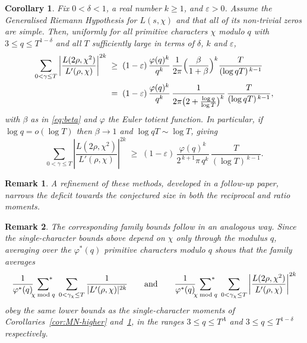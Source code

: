 \documentclass[10pt,a4paper]{amsart}
\newtheorem{corollary}[theorem]{Corollary}
\newtheorem*{remark}{Remark}
\numberwithin{equation}{section}
\begin{document}
\begin{corollary}\label{cor:Ng-higher}
Fix $0<\delta<1$, a real number $k\ge1$, and $\varepsilon>0$. Assume the
Generalised Riemann Hypothesis for $L(s,\chi)$ and that all of its non-trivial
zeros are simple. Then, uniformly for all primitive characters $\chi$ modulo $q$
with $3\le q\le T^{1-\delta}$ and all $T$ sufficiently large in terms of $\delta$,
$k$ and $\varepsilon$,
\begin{align*}
      \sum_{0<\gamma\le T}\left|\frac{L(2\rho,\chi^2)}{L'(\rho,\chi)}\right|^{2k}
  \;&\ge\;(1-\varepsilon)\,\frac{\varphi(q)^{k}}{q^{k}}\,\frac{1}{2\pi}
  \Bigl(\frac{\beta}{1+\beta}\Bigr)^{k}\frac{T}{(\log qT)^{\,k-1}} \\
  &=\;(1-\varepsilon)\,\frac{\varphi(q)^{k}}{q^{k}}\,
  \frac{1}{2\pi\bigl(2+\frac{\log q}{\log T}\bigr)^{k}}\,\frac{T}{(\log qT)^{\,k-1}},
\end{align*}
with $\beta$ as in \eqref{eq:beta} and $\varphi$ the Euler totient function. In
particular, if $\log q=o(\log T)$ then $\beta\to1$ and $\log qT\sim\log T$, giving
\[
  \sum_{0<\gamma\le T}\left|\frac{L(2\rho,\chi^2)}{L'(\rho,\chi)}\right|^{2k}
  \;\ge\;(1-\varepsilon)\,\frac{\varphi(q)^{k}}{2^{\,k+1}\pi\,q^{k}}\,
  \frac{T}{(\log T)^{\,k-1}} .
\]
\end{corollary}

\begin{remark}
A refinement of these methods, developed in a follow-up paper, narrows the deficit towards the conjectured size in both the reciprocal and ratio moments.
\end{remark}

\begin{remark}
The corresponding family bounds follow in an analogous way. Since the single-character bounds above depend on $\chi$ only through the modulus $q$, averaging over the $\varphi^*(q)$ primitive characters modulo $q$ shows that the family averages
\[
\frac{1}{\varphi^*(q)}\sideset{}{^*}\sum_{\chi\bmod q}\;\sum_{0<\gamma_\chi\le T}\frac{1}{|L'(\rho,\chi)|^{2k}}
\qquad\text{and}\qquad
\frac{1}{\varphi^*(q)}\sideset{}{^*}\sum_{\chi\bmod q}\;\sum_{0<\gamma_\chi\le T}\left|\frac{L(2\rho,\chi^2)}{L'(\rho,\chi)}\right|^{2k}
\]
obey the same lower bounds as the single-character moments of Corollaries~\ref{cor:MN-higher} and~\ref{cor:Ng-higher}, in the ranges $3\le q\le T^{A}$ and $3\le q\le T^{1-\delta}$ respectively.
\end{remark}
\end{document}

